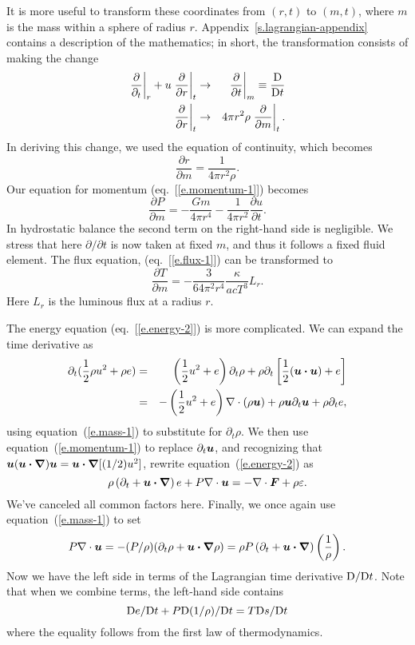 It is more useful to transform these coordinates from $(r,t)$ to $(m,t)$, where $m$ is the mass within a sphere of radius $r$.  Appendix~\ref{s.lagrangian-appendix} contains a description of the mathematics; in short, the transformation consists of making the change
\begin{eqnarray}
	\label{e.lagrange-rule-1}
	\left.\frac{\partial}{\partial_{t}}\right|_{r} + u\left.\frac{\partial}{\partial r}\right|_{t} 
	&\to& \left.\frac{\partial}{\partial t}\right|_{m} \equiv \frac{\mathrm{D}}{\mathrm{D} t} \\
	\label{e.lagrange-rule-2}
	\left.\frac{\partial}{\partial r}\right|_{t} &\to& 4\pi r^{2}\rho \left.\frac{\partial}{\partial m}\right|_{t}.
\end{eqnarray}
In deriving this change, we used the equation of continuity, which becomes
\begin{equation}\label{e.lagrange-r}
\frac{\partial r}{\partial m} = \frac{1}{4\pi r^{2}\rho}.
\end{equation}
Our equation for momentum (eq.~[\ref{e.momentum-1}]) becomes
\begin{equation}\label{e.lagrange-momentum}
\frac{\partial P}{\partial m} = -\frac{Gm}{4\pi r^{4}} - \frac{1}{4\pi r^{2}}\frac{\partial u}{\partial t}.
\end{equation}
In hydrostatic balance the second term on the right-hand side is negligible.  We stress that here $\partial/\partial t$ is now taken at fixed $m$, and thus it follows a fixed fluid element.  The flux equation, (eq.~[\ref{e.flux-1}]) can be transformed to
\begin{equation}\label{e.lagrange-flux}
	\frac{\partial T}{\partial m} = -\frac{3}{64\pi^{2}r^{4}}\frac{\kappa}{ac T^{3}}L_{r}.
\end{equation}
Here $L_{r}$ is the luminous flux at a radius $r$. 

The energy equation (eq.~[\ref{e.energy-2}]) is more complicated. We can expand the time derivative as
\begin{eqnarray*}
	\partial_{t}(\frac{1}{2}\rho u^{2} + \rho e) 
	&=& \left(\frac{1}{2}u^{2} + e\right)\partial_{t}\rho + \rho\partial_{t}\left[\frac{1}{2}(\boldsymbol{u}\boldsymbol{\cdot}\boldsymbol{u}) + e\right]\\
	&=& -\left(\frac{1}{2}u^{2} + e\right)\nabla \cdot\left(\rho\boldsymbol{u}\right) + \rho \boldsymbol{u}\partial_{t}\boldsymbol{u} + \rho\partial_{t}e,
\end{eqnarray*}
using equation~(\ref{e.mass-1}) to substitute for $\partial_{t}\rho$.  We then use equation~(\ref{e.momentum-1}) to replace $\partial_{t}\boldsymbol{u}$, and recognizing that $\boldsymbol{u}(\boldsymbol{u}\boldsymbol{\cdot}\boldsymbol{\nabla})\boldsymbol{u} = \boldsymbol{u}\boldsymbol{\cdot}\boldsymbol{\nabla}[(1/2)u^{2}]$, rewrite equation~(\ref{e.energy-2}) as
\[ 
	\rho\left(\partial_{t} + \boldsymbol{u}\boldsymbol{\cdot}\boldsymbol{\nabla}\right) e + P\nabla \cdot\boldsymbol{u} = -\nabla \cdot\boldsymbol{F} + \rho\varepsilon.
\]
We've canceled all common factors here.  Finally, we once again use equation~(\ref{e.mass-1}) to set 
\[
	P\nabla \cdot\boldsymbol{u} = -(P/\rho)(\partial_{t}\rho + \boldsymbol{u}\boldsymbol{\cdot}\boldsymbol{\nabla} \rho) 
	= \rho P\left(\partial_{t} + \boldsymbol{u}\boldsymbol{\cdot}\boldsymbol{\nabla}\right)\left(\frac{1}{\rho}\right).
\]
Now we have the left side in terms of the Lagrangian time derivative $\mathrm{D}/\mathrm{D} t$.  Note that when we combine terms, the left-hand side contains 
\[ \mathrm{D} e/\mathrm{D} t + P\mathrm{D} (1/\rho)/\mathrm{D} t = T\mathrm{D} s/\mathrm{D} t \] 
where the equality follows from the first law of thermodynamics.

